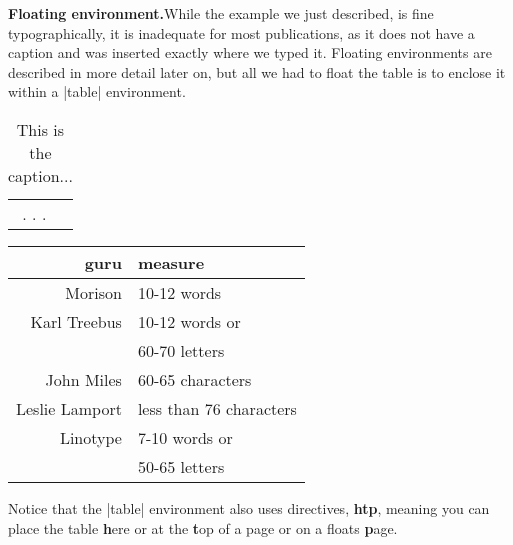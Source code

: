 \begin{multicols}{2}
\textbf{Floating environment.}\quad While the example we just described, is fine typographically, it is inadequate for most publications, as it does not have a caption and was inserted exactly where we typed it. Floating environments are described in more detail later on, but all we had to float the table is to enclose it within a |table| environment.

\begin{teXXX}
\begin{table}[htp]
\begin{tabular}{rl}
.
.
.
\end{tabular}
\caption{This is the caption...}
\end{table}
\end{teXXX}
\columnbreak
\begin{tabular}{rl}
\toprule
  guru                & measure \\
\midrule
  Morison             & 10-12 words \\
  Karl Treebus        & 10-12 words or\\
                      & 60-70 letters \\
  John Miles          & 60-65 characters \\
  Leslie Lamport      & less than 76 characters \\
  Linotype            & 7-10 words or\\
                      & 50-65 letters\\
\bottomrule
\end{tabular}
\medskip
Notice that the |table| environment also uses directives, \textbf{htp}, meaning you can place the table \textbf{h}ere or at the \textbf{t}op of a page or on a floats \textbf{p}age.
\end{multicols}
\clearpage

